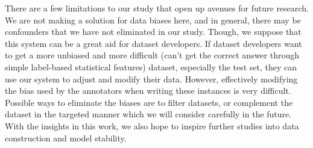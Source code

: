 There are a few limitations to our study that open up avenues
for future research. We are not making a solution for data biases here,
and in general, there may be confounders that we have not
eliminated in our study. 
Though,  we suppose that this system can be a great aid for dataset developers. 
If dataset developers want to get a more unbiased and more difficult 
(can't get the correct answer through simple label-based statistical features) dataset, 
especially the test set, they can use our system to adjust and modify their data. 
However, effectively modifying 
the bias used by the annotators when writing these instances is very difficult. 
Possible ways to eliminate the biases are to filter datasets, 
or complement the dataset in the targeted manner which we will consider carefully in the future. 
With the insights in this work, we also hope to inspire further studies
into data construction and model stability.
